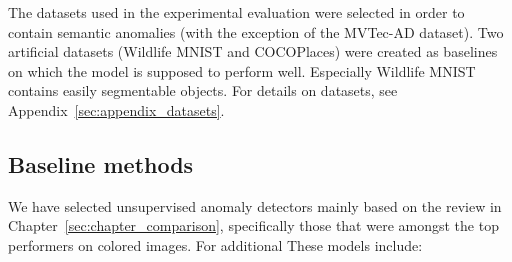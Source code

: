 The datasets used in the experimental evaluation were selected in order to contain semantic anomalies (with the exception of the MVTec-AD dataset). Two artificial datasets (Wildlife MNIST and COCOPlaces) were created as baselines on which the model is supposed to perform well. Especially Wildlife MNIST contains easily segmentable objects. For details on datasets, see Appendix~\ref{sec:appendix_datasets}.

\subsection{Baseline methods}
We have selected unsupervised anomaly detectors mainly based on the review in Chapter~\ref{sec:chapter_comparison}, specifically those that were amongst the top performers on colored images. For additional These models include:

